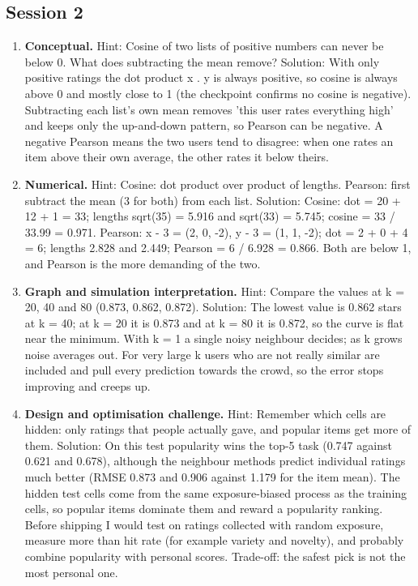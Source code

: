 \documentclass[11pt,a4paper]{article}
\begin{document}
\subsection*{Session 2}
\begin{enumerate}[nosep]
\item \textbf{Conceptual.} Hint: Cosine of two lists of positive numbers can never be below 0. What does subtracting the mean remove? Solution: With only positive ratings the dot product x . y is always positive, so cosine is always above 0 and mostly close to 1 (the checkpoint confirms no cosine is negative). Subtracting each list's own mean removes 'this user rates everything high' and keeps only the up-and-down pattern, so Pearson can be negative. A negative Pearson means the two users tend to disagree: when one rates an item above their own average, the other rates it below theirs.
\item \textbf{Numerical.} Hint: Cosine: dot product over product of lengths. Pearson: first subtract the mean (3 for both) from each list. Solution: Cosine: dot = 20 + 12 + 1 = 33; lengths sqrt(35) = 5.916 and sqrt(33) = 5.745; cosine = 33 / 33.99 = 0.971. Pearson: x - 3 = (2, 0, -2), y - 3 = (1, 1, -2); dot = 2 + 0 + 4 = 6; lengths 2.828 and 2.449; Pearson = 6 / 6.928 = 0.866. Both are below 1, and Pearson is the more demanding of the two.
\item \textbf{Graph and simulation interpretation.} Hint: Compare the values at k = 20, 40 and 80 (0.873, 0.862, 0.872). Solution: The lowest value is 0.862 stars at k = 40; at k = 20 it is 0.873 and at k = 80 it is 0.872, so the curve is flat near the minimum. With k = 1 a single noisy neighbour decides; as k grows noise averages out. For very large k users who are not really similar are included and pull every prediction towards the crowd, so the error stops improving and creeps up.
\item \textbf{Design and optimisation challenge.} Hint: Remember which cells are hidden: only ratings that people actually gave, and popular items get more of them. Solution: On this test popularity wins the top-5 task (0.747 against 0.621 and 0.678), although the neighbour methods predict individual ratings much better (RMSE 0.873 and 0.906 against 1.179 for the item mean). The hidden test cells come from the same exposure-biased process as the training cells, so popular items dominate them and reward a popularity ranking. Before shipping I would test on ratings collected with random exposure, measure more than hit rate (for example variety and novelty), and probably combine popularity with personal scores. Trade-off: the safest pick is not the most personal one.
\end{enumerate}
\end{document}
